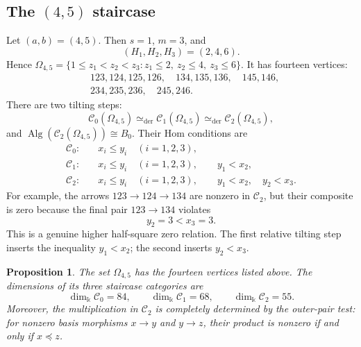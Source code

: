 \documentclass[12pt,a4paper,english,reqno]{amsart}
\theoremstyle{plain}
\newtheorem{proposition}[theorem]{Proposition}
\theoremstyle{definition}
\newcommand{\kk}{\Bbbk}
\newcommand{\C}{\mathcal C}
\newcommand{\lra}{\longrightarrow}
\begin{document}
\subsection{The \texorpdfstring{$(4,5)$}{(4,5)} staircase}

Let $(a,b)=(4,5)$.  Then $s=1$, $m=3$, and
\[
 (H_1,H_2,H_3)=(2,4,6).
\]
Hence $\Omega_{4,5}=
 \{1\leq z_1<z_2<z_3:
 z_1\leq2,\ z_2\leq4,\ z_3\leq6\}$.
It has fourteen vertices:
\begin{align*}
 &123,124,125,126,\quad
 134,135,136,\quad
 145,146,\\
 &234,235,236,\quad
 245,246.
\end{align*}
There are two tilting steps:
\[
 \C_0(\Omega_{4,5})
 \simeq_{\mathrm{der}}
 \C_1(\Omega_{4,5})
 \simeq_{\mathrm{der}}
 \C_2(\Omega_{4,5}),
\]
and $\operatorname{Alg}(\C_2(\Omega_{4,5}))\cong B_0$.
Their Hom conditions are
\begin{align*}
 \C_0:\quad&
 x_i\leq y_i\quad(i=1,2,3),\\
 \C_1:\quad&
 x_i\leq y_i\quad(i=1,2,3),\qquad y_1<x_2,\\
 \C_2:\quad&
 x_i\leq y_i\quad(i=1,2,3),\qquad
 y_1<x_2,\quad y_2<x_3.
\end{align*}
For example, the arrows $123\lra 124\lra 134$
are nonzero in $\C_2$, but their composite is zero because the final pair
$123\to134$ violates
\[
 y_2=3<x_3=3.
\]
This is a genuine higher half-square zero relation.  The first relative
tilting step inserts the inequality $y_1<x_2$; the second inserts
$y_2<x_3$.

\begin{proposition}
\label{prop:45-full-check}
The set $\Omega_{4,5}$ has the fourteen vertices listed above.  The
dimensions of its three staircase categories are
\[
 \dim_{\kk}\C_0=84,\qquad
 \dim_{\kk}\C_1=68,\qquad
 \dim_{\kk}\C_2=55.
\]
Moreover, the multiplication in $\C_2$ is completely determined by the
outer-pair test: for nonzero basis morphisms $x\to y$ and $y\to z$,
their product is nonzero if and only if $x\preceq z$.
\end{proposition}
\end{document}
